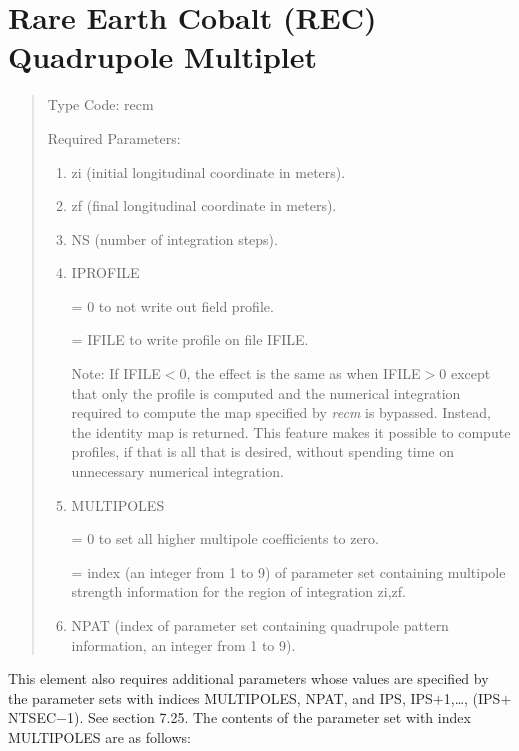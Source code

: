 \section{Rare Earth Cobalt (REC) Quadrupole Multiplet}
\begin{quotation}
\noindent     Type Code:  recm   
\vspace{5mm}

\noindent     Required Parameters:
\begin{enumerate}
       \item  zi (initial longitudinal coordinate in meters).
       \item  zf (final longitudinal coordinate in meters).
       \item  NS (number of integration steps).
       \item  IPROFILE

              = 0 to not write out field profile.

              = IFILE to write profile on file IFILE.

              Note:  If IFILE$<0$, the effect is the same as when IFILE$>0$ except that
              only the profile is computed and the numerical integration required to
              compute the map specified by {\em recm} is bypassed.  Instead, the identity
              map is returned.  This feature makes it possible to compute profiles, if
              that is all that is desired, without spending time on unnecessary numerical
              integration.
       \item  MULTIPOLES

              = 0 to set all higher multipole coefficients to zero.

              = index (an integer from 1 to 9) of parameter set containing multipole
              \hspace*{1.2em}strength information for the region of integration zi,zf.

              \item  NPAT (index of parameter set containing quadrupole pattern
              information, an integer from 1 to 9).
\end{enumerate}
\end{quotation}
This element also requires additional parameters whose values are specified
by the parameter sets with indices MULTIPOLES, NPAT, and IPS, IPS$+$1,\ldots, (IPS$+$NTSEC$-$1).
See section 7.25.  The contents of the parameter set with index MULTIPOLES are as follows:
